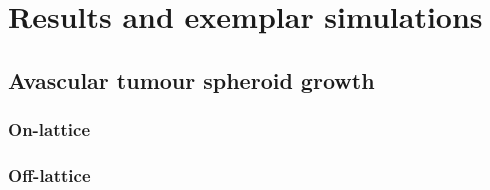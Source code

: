 \documentclass[superscriptaddress, a4paper]{article}
\begin{document}
\section{Results and exemplar simulations}
\label{sec:results}

\subsection{Avascular tumour spheroid growth}
\label{sec:avascular tumour spheroid growth}

\subsubsection{On-lattice}
\label{sec:on-lattice avascular tumour spheroid growth}



\subsubsection{Off-lattice}
\label{sec:off-lattice avascular tumour spheroid growth}
\end{document}
